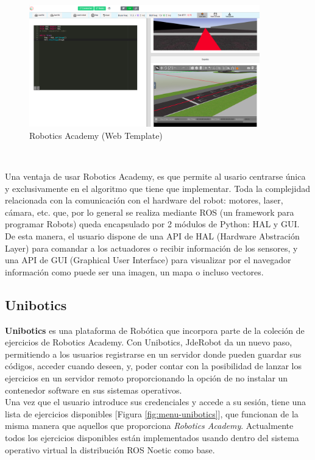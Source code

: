 \begin{figure} [h!]
  \begin{center}
    \includegraphics[width=10cm]{imagenes/cap1/robotics-academy-web-template.png}
  \end{center}
  \caption[Robotics Academy (Web Template)]{Robotics Academy (Web Template)}
  \label{fig:rob-ac-web-template}
\end{figure}\

Una ventaja de usar Robotics Academy, es que permite al usario centrarse única y exclusivamente en el algoritmo que tiene que implementar. Toda la complejidad relacionada con la comunicación con el hardware del robot: motores, laser, cámara, etc. que, por lo general se realiza mediante ROS (un framework para programar Robots) queda encapsulado por 2 módulos de Python: HAL y GUI. De esta manera, el usuario dispone de una API de HAL (Hardware Abstración Layer) para comandar a los actuadores o recibir información de los sensores, y una API de GUI (Graphical User Interface) para visualizar por el navegador información como puede ser una imagen, un mapa o incluso vectores.\\

\subsection{Unibotics}
\label{sec:unibotics}

\textbf{Unibotics} es una plataforma de Robótica que incorpora parte de la coleción de ejercicios de Robotics Academy. Con Unibotics, JdeRobot da un nuevo paso, permitiendo a los usuarios registrarse en un servidor donde pueden guardar sus códigos, acceder cuando deseen, y, poder contar con la posibilidad de lanzar los ejercicios en un servidor remoto proporcionando la opción de no instalar un contenedor software en sus sistemas operativos.\\

Una vez que el usuario introduce sus credenciales y accede a su sesión, tiene una lista de ejercicios disponibles [Figura \ref{fig:menu-unibotics}], que funcionan de la misma manera que aquellos que proporciona \textit{Robotics Academy}. Actualmente todos los ejercicios disponibles están implementados usando dentro del sistema operativo virtual la distribución ROS Noetic como base.\\

